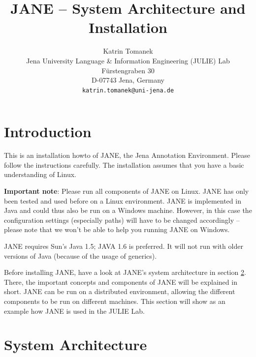 \documentclass[DIV12,english,11pt,halfparskip]{scrartcl}
\title{JANE -- System Architecture and Installation}
\author{\normalsize Katrin Tomanek\\
  \normalsize  Jena University Language \& Information Engineering (JULIE) Lab\\
  \normalsize F\"urstengraben 30 \\
  \normalsize D-07743 Jena, Germany\\
  {\normalsize \tt katrin.tomanek@uni-jena.de} } \date{}
\begin{document}
\maketitle
\newpage
\tableofcontents
\newpage
\section{Introduction}

This is an installation howto of JANE, the Jena Annotation
Environment. Please follow the instructions carefully. The
installation assumes that you have a basic understanding of Linux.

\textbf{Important note}: Please run all components of JANE on Linux.
JANE has only been tested and used before on a Linux environment. JANE
is implemented in Java and could thus also be run on a Windows
machine. However, in this case the configuration settings (especially
paths) will have to be changed accordingly -- please note that we
won't be able to help you running JANE on Windows.

JANE requires Sun's Java 1.5; JAVA 1.6 is preferred. It will not run
with older versions of Java (because of the usage of generics).

Before installing JANE, have a look at JANE's system architecture in
section \ref{sec:architecture}. There, the important concepts and
components of JANE will be explained in short. JANE can be run on a
distributed environment, allowing the different components to be run
on different machines. This section will show as an example how JANE
is used in the JULIE Lab.



\section{System Architecture}
\label{sec:architecture}
\end{document}
